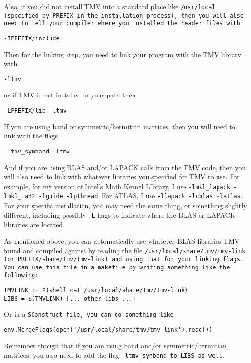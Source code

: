 Also, if you did not install TMV into a standard place like \tt{/usr/local} (specified
by \tt{PREFIX} in the installation process), then you will also
need to tell your compiler where you installed the header files with
\begin{verbatim}
-IPREFIX/include
\end{verbatim}

Then for the linking step, you need to link your program with the TMV
library with
\begin{verbatim}
-ltmv
\end{verbatim}
or if TMV is not installed in your path then
\begin{verbatim}
-LPREFIX/lib -ltmv
\end{verbatim}
If you are using band or symmetric/hermitian matrices, then you will
need to link with the flags
\begin{verbatim}
-ltmv_symband -ltmv
\end{verbatim}

And if you are using BLAS and/or LAPACK calls from the TMV code,
then you will also need to
link with whatever libraries you specified for TMV to use.
For example, for my version of Intel's Math Kernel LIbrary, I use
\texttt{-lmkl\_lapack -lmkl\_ia32 -lguide -lpthread}.
For ATLAS,
I use \texttt{-llapack -lcblas -latlas}.  For your specific installation, you may need
the same thing, or something slightly different, including possibly
\texttt{-L} flags to indicate where the BLAS or LAPACK libraries are located.

As mentioned above, 
you can automatically use whatever BLAS libraries
TMV found and compiled against by reading the file
\tt{/usr/local/share/tmv/tmv-link} (or \tt{PREFIX/share/tmv/tmv-link}) and using that
for your linking flags.  
You can use this file in a \tt{makefile} by writing 
something like the following:
\begin{verbatim}
TMVLINK := $(shell cat /usr/local/share/tmv/tmv-link)
LIBS = $(TMVLINK) [... other libs ...]
\end{verbatim}
Or in a \tt{SConstruct} file, you can do something like
\begin{verbatim}
env.MergeFlags(open('/usr/local/share/tmv/tmv-link').read())
\end{verbatim}
Remember though that if you are using band and/or symmetric/hermitian matrices, you
also need to add the flag \tt{-ltmv\_symband} to \tt{LIBS} as well.

